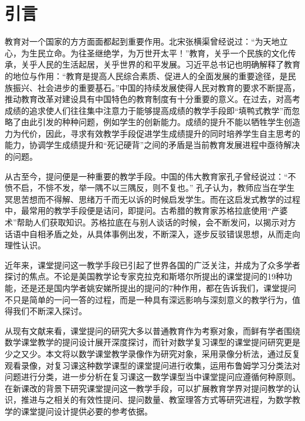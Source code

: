 \chapter{引言}


教育对一个国家的方方面面都起到重要作用。北宋张横渠曾经说过：“为天地立心，为生民立命。为往圣继绝学，为万世开太平！”教育，关乎一个民族的文化传承，关乎人民的生活起居，关乎世界的和平发展。习近平总书记也明确解释了教育的地位与作用：“教育是提高人民综合素质、促进人的全面发展的重要途径，是民族振兴、社会进步的重要基石。”中国的持续发展使得人民对教育的要求不断提高，推动教育改革对建设具有中国特色的教育制度有十分重要的意义。在过去，对高考成绩的追求使人们往往集中注意力于能够提高成绩的教学手段即“填鸭式教学”而忽略了由此引发的种种问题，例如学生的创新能力。成绩的提升不能以牺牲学生创造力为代价，因此，寻求有效教学手段促进学生成绩提升的同时培养学生自主思考的能力，协调学生成绩提升和“死记硬背”之间的矛盾是当前教育发展进程中亟待解决的问题。

从古至今，提问便是一种重要的教学手段。中国的伟大教育家孔子曾经说过：“不愤不启，不悱不发，举一隅不以三隅反，则不复也。” 孔子认为，教师应当在学生冥思苦想而不得解、思绪万千而无以诉的时候启发学生。而在这启发式教学的过程中，最常用的教学手段便是诘问，即提问。古希腊的教育家苏格拉底使用“产婆术”帮助人们获取知识。苏格拉底在与别人谈话的时候，会不断发问，以揭示对方话语中自相矛盾之处，从具体事例出发，不断深入，逐步反驳错误思想，从而走向理性认识。

近年来，课堂提问这一教学手段已引起了世界各国的广泛关注，并成为了众多学者探讨的焦点。不论是美国教学论专家克拉克和斯塔尔所提出的课堂提问的19种功能，还是还是国内学者姚安娣所提出的提问的7种作用，都在告诉我们，课堂提问不只是简单的一问一答的过程，而是一种具有深远影响与深刻意义的教学行为，值得我们不断深入探讨。

从现有文献来看，课堂提问的研究大多以普通教育作为考察对象，而鲜有学者围绕数学课堂教学的提问设计展开深度探讨，而针对数学复习课型的课堂提问研究更是少之又少。本文将以数学课堂教学录像作为研究对象，采用录像分析法，通过反复观看录像，对复习课这种数学课型的课堂提问进行收集，运用布鲁姆学习分类法对问题进行分类，进一步分析在复习课这一数学课型当中课堂提问应遵循何种原则。在新课改的背景下研究课堂提问这一教学手段，可以扩展教育学界对提问教学的认识，推进与之相关的有效性提问、提问数量、教室理答方式等研究进程，为数学教学的课堂提问设计提供必要的参考依据。